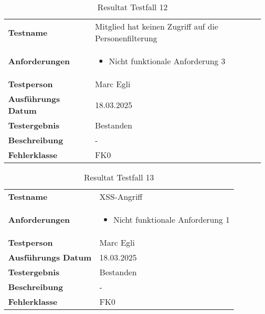 \begin{table}[H]
    \begin{tabular}{|L{0.3\textwidth}|L{0.65\textwidth}|}
        \hline
           \\[10pt]
        \hline
        \textbf{Testname} & Mitglied hat keinen Zugriff auf die Personenfilterung \\
        \hline
        \textbf{Anforderungen} & 
        \begin{itemize}
            \item Nicht funktionale Anforderung 3
        \end{itemize} \\
        \hline
        \textbf{Testperson} & Marc Egli \\
        \hline
        \textbf{Ausführungs Datum} & 18.03.2025 \\
        \hline
        \textbf{Testergebnis} & Bestanden \\
        \hline
        \textbf{Beschreibung} & - \\ 
        \hline
        \textbf{Fehlerklasse} & FK0 \\ 
        \hline
    \end{tabular}
    \caption{Resultat Testfall 12}
\end{table}

\begin{table}[H]
    \begin{tabular}{|L{0.3\textwidth}|L{0.65\textwidth}|}
        \hline
           \\[10pt]
        \hline
        \textbf{Testname} & XSS-Angriff \\
        \hline
        \textbf{Anforderungen} & 
        \begin{itemize}
            \item Nicht funktionale Anforderung 1
        \end{itemize} \\
        \hline
        \textbf{Testperson} & Marc Egli \\
        \hline
        \textbf{Ausführungs Datum} & 18.03.2025 \\
        \hline
        \textbf{Testergebnis} & Bestanden \\
        \hline
        \textbf{Beschreibung} & - \\ 
        \hline
        \textbf{Fehlerklasse} & FK0 \\ 
        \hline
    \end{tabular}
    \caption{Resultat Testfall 13}
\end{table}

